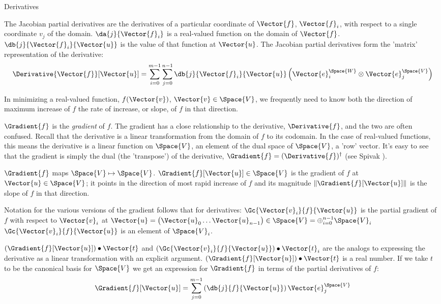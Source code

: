 \begin{plSection}{Derivatives}
\begin{itemize}
The Jacobian partial derivatives are the derivatives of
a particular coordinate of $\Vector{f}$, $\Vector{f}_i$, with respect to
a single coordinate $v_j$ of the domain.
$\da{j}{\Vector{f}_i}$ is a real-valued function on the domain of $\Vector{f}$.
$\db{j}{\Vector{f}_i}{\Vector{u}}$ is the value of that function at $\Vector{u}$.
The Jacobian partial derivatives form the 'matrix' representation of the derivative:
\begin{equation}
\Derivative{\Vector{f}}[\Vector{u}] =
\sum_{i=0}^{m-1}
\sum_{j=0}^{n-1}
\db{j}{\Vector{f}_i}{\Vector{u}}
\left( 
\Vector{e}_i^{\Space{W}} \otimes \Vector{e}_j^{\Space{V}} 
\right)
\end{equation}

\end{itemize}

In minimizing a real-valued function, $f(\Vector{v})$, $\Vector{v} \in \Space{V}$,
we frequently need to know both the direction of maximum increase of $f$
the rate of increase, or slope, of $f$ in that direction.

$\Gradient{f}$ is the \textit{gradient} of $f$.
The gradient has a close relationship to the derivative, $\Derivative{f}$,
and the two are often confused.
Recall that the derivative is a linear transformation
from the domain of $f$ to its codomain.
In the case of real-valued functions,
this means the derivative is a linear function on $\Space{V}$,
an element of the dual space of $\Space{V}$, a 'row' vector.
It's easy to see that the gradient is simply the dual (the 'transpose')
of the derivative, $\Gradient{f} = (\Derivative{f})^{\dagger}$
(see Spivak \cite[p.~96, ex.~4-18]{Spivak:1965:CalculusOnManifolds}).

$\Gradient{f}$ maps $\Space{V} \mapsto \Space{V}$.
$\Gradient{f}[\Vector{u}] \in \Space{V}$ 
is the gradient of $f$ at $\Vector{u} \in \Space{V}$;
it points in the direction of most rapid increase of
$f$ and its magnitude $\| \Gradient{f}[\Vector{u}] \|$ is the
slope of $f$ in that direction.

Notation for the various versions of the gradient
follows that for derivatives:
$\Gc{\Vector{v}_i}{f}{\Vector{u}}$ is the partial gradient of $f$ with respect to $\Vector{v}_i$ at
$\Vector{u} = \left( \Vector{u}_0 \ldots \Vector{u}_{n-1} \right) \in \Space{V} = \oplus_{i=0}^{n-1} \Space{V}_i$
$\Gc{\Vector{v}_i}{f}{\Vector{u}}$ is an element of $\Space{V}_i$.

$(\Gradient{f}[\Vector{u}]) \bullet  \Vector{t}$
and
$(\Gc{\Vector{v}_i}{f}{\Vector{u}}) \bullet \Vector{t}_i$
are the analogs to expressing the derivative as a linear transformation
with an explicit argument.
$(\Gradient{f}[\Vector{u}]) \bullet  \Vector{t}$ is a real number.
If we take $t$ to be the canonical basis for $\Space{V}$
we get an expression for $\Gradient{f}$ in terms of the partial derivatives of $f$:
\begin{equation}
\label{eq:gradient-from-partials}
\Gradient{f}[\Vector{u}] 
= \sum_{j=0}^{m-1} 
\left( 
\db{j}{f}{\Vector{u}} 
\right) \Vector{e}_j^{\Space{V}}
\end{equation}


\end{plSection}
